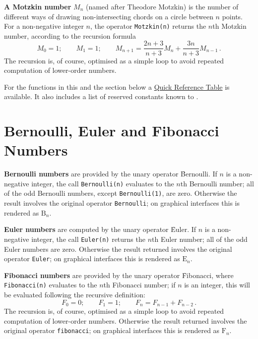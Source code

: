 \hypertarget{operator:MOTZKIN}{}
\textbf{A Motzkin number} $M_{n}$ (named after Theodore Motzkin) is the
number of different ways of drawing non-intersecting chords on a circle between
$n$ points. For a non-negative integer $n$, the operator \texttt{Motzkin(n)}
returns the $n$th Motzkin number, according to the recursion formula
\[
  M_{0} = 1; \qquad M_{1}=1; \qquad
  M_{n+1} = \frac{2n+3}{n+3}M_{n}+ \frac{3n}{n+3}M_{n-1}\,.
\]
The recursion is, of course, optimised as a simple loop to avoid repeated
computation of lower-order numbers.

For the functions in this and the section below
a \hyperlink{SPECFNTAB4}{Quick Reference Table} is available.
It also includes a list of reserved constants known to {\REDUCE}.

\section{Bernoulli, Euler and Fibonacci Numbers}
\hypertarget{operator:BERNOULLI}{}
\textbf{Bernoulli numbers} are provided by the unary operator
\f{Bernoulli}. If $n$ is a non-negative integer, the call \texttt{Bernoulli(n)}
evaluates to the $n$th Bernoulli number; all of the odd Bernoulli numbers,
except \texttt{Bernoulli(1)}, are zero. Otherwise the result involves the
original operator \texttt{Bernoulli}; on graphical interfaces this is rendered
as $\mathrm{B}_n$.

\hypertarget{operator:EULER}{}
\textbf{Euler numbers} are computed by the unary operator \f{Euler}.  If $n$
is a non-negative integer, the call \texttt{Euler(n)} returns the $n$th
Euler number; all of the odd Euler numbers are zero.
Otherwise the result returned involves the original operator \texttt{Euler};
on graphical interfaces this is rendered
as $\mathrm{E}_n$.

\hypertarget{operator:FIBONACCI}{}
\textbf{Fibonacci numbers} are provided by the unary operator \f{Fibonacci},
where \texttt{Fibonacci(n)} evaluates to the $n$th Fibonacci
number; if $n$ is an integer, this will be evaluated following
the recursive definition:
\[F_0 = 0; \qquad F_1 = 1;\qquad F_n = F_{n-1} + F_{n-2}\,.\]
The recursion is, of course, optimised as a simple loop to avoid repeated
computation of lower-order numbers.
Otherwise the result returned involves the original operator
\texttt{fibonacci}; on graphical interfaces this is rendered
as $\mathrm{F}_n$.


